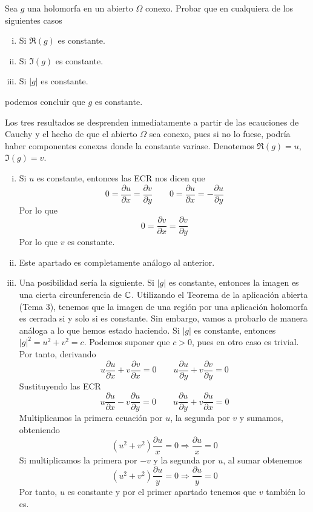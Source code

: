 \documentclass[twoside]{article}
\begin{document}
\begin{ejercicio}{3}
Sea $g$ una holomorfa en un abierto $\Omega$ conexo. Probar que en cualquiera de los siguientes casos
\begin{enumerate}[(i)]
\item Si $\Re(g)$ es constante.
\item Si $\Im(g)$ es constante.
\item Si $|g|$ es constante.
\end{enumerate}
podemos concluir que $g$ es constante.
\end{ejercicio}
\begin{solucion}
Los tres resultados se desprenden inmediatamente a partir de las ecauciones de Cauchy y el hecho de que el abierto $\Omega$ sea conexo, pues si no lo fuese, podría haber componentes conexas donde la constante variase. Denotemos $\Re(g)=u$, $\Im(g)=v$.
\begin{enumerate}[(i)]
\item Si $u$ es constante, entonces las ECR nos dicen que
$$
0 = \frac{\partial u}{\partial x} = \frac{\partial v}{\partial y} \qquad 0 = \frac{\partial u}{\partial x} = - \frac{\partial u}{\partial y}$$
Por lo que 
$$
0 = \frac{\partial v}{\partial x}  =\frac{\partial v}{\partial y} 
$$ 
Por lo que $v$ es constante.
\item Este apartado es completamente análogo al anterior.
\item Una posibilidad sería la siguiente. Si $|g|$ es constante, entonces la imagen es una cierta circunferencia de $\mathbb{C}$. Utilizando el Teorema de la aplicación abierta (Tema 3), tenemos que la imagen de una región por una aplicación holomorfa es cerrada si y solo si es constante. Sin embargo, vamos a probarlo de manera análoga a lo que hemos estado haciendo. Si $|g|$ es constante, entonces $|g|^2 =u^2+v^2 = c$. Podemos suponer que $c>0$, pues en otro caso es trivial. Por tanto, derivando
$$
u\frac{\partial u}{\partial x} + v\frac{\partial v}{\partial x} = 0 \qquad u\frac{\partial u}{\partial y} + v\frac{\partial v}{\partial y} = 0
$$
Sustituyendo las ECR
$$
u\frac{\partial u}{\partial x} - v\frac{\partial u}{\partial y} = 0 \qquad u\frac{\partial u}{\partial y} + v\frac{\partial u}{\partial x} = 0
$$
Multiplicamos la primera ecuación por $u$, la segunda por $v$ y sumamos, obteniendo
$$(u^2+v^2)\frac{\partial u}{x} = 0 \Rightarrow \frac{\partial u}{x} = 0$$
Si multiplicamos la primera por $-v$ y la segunda por $u$, al sumar obtenemos
$$(u^2+v^2)\frac{\partial u}{y} = 0 \Rightarrow \frac{\partial u}{y} = 0 
$$
Por tanto, $u$ es constante y por el primer apartado tenemos que $v$ también lo es.
\end{enumerate}
\end{solucion}
\newpage
\end{document}
